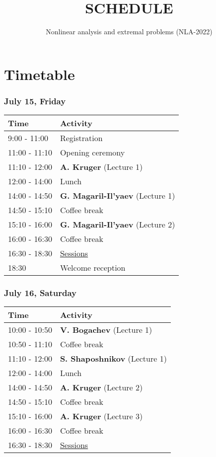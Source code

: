 \documentclass[
]{article}
\title{SCHEDULE}
\subtitle{Nonlinear analysis and extremal problems (NLA-2022)}
\author{}
\date{\vspace{-2.5em}}
\begin{document}
\maketitle

\vspace{-25pt}

\hypertarget{timetable}{%
\section{Timetable}\label{timetable}}

\hypertarget{july-15-friday}{%
\subsubsection{July 15, Friday}\label{july-15-friday}}

\begin{longtable}[]{@{}ll@{}}
\toprule()
Time & Activity \\
\midrule()
\endhead
9:00 - 11:00 & Registration \\
11:00 - 11:10 & Opening ceremony \\
11:10 - 12:00 & \textbf{A. Kruger} (Lecture 1) \\
12:00 - 14:00 & Lunch \\
14:00 - 14:50 & \textbf{G. Magaril-Il'yaev} (Lecture 1) \\
14:50 - 15:10 & Coffee break \\
15:10 - 16:00 & \textbf{G. Magaril-Il'yaev} (Lecture 2) \\
16:00 - 16:30 & Coffee break \\
16:30 - 18:30 & \protect\hyperlink{se}{Sessions} \\
18:30 & Welcome reception \\
\bottomrule()
\end{longtable}

\hypertarget{july-16-saturday}{%
\subsubsection{July 16, Saturday}\label{july-16-saturday}}

\begin{longtable}[]{@{}ll@{}}
\toprule()
Time & Activity \\
\midrule()
\endhead
10:00 - 10:50 & \textbf{V. Bogachev} (Lecture 1) \\
10:50 - 11:10 & Coffee break \\
11:10 - 12:00 & \textbf{S. Shaposhnikov} (Lecture 1) \\
12:00 - 14:00 & Lunch \\
14:00 - 14:50 & \textbf{A. Kruger} (Lecture 2) \\
14:50 - 15:10 & Coffee break \\
15:10 - 16:00 & \textbf{A. Kruger} (Lecture 3) \\
16:00 - 16:30 & Coffee break \\
16:30 - 18:30 & \protect\hyperlink{se}{Sessions} \\
\bottomrule()
\end{longtable}
\end{document}
